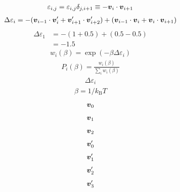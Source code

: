 \documentclass[43pt]{jsarticle}
\def\vector#1{\mbox{\boldmath \(#1\)}}
\begin{document}
\begin{eqnarray*}
  \varepsilon_{i, j} = \varepsilon_{i, j}\delta_{j, i+1} \equiv - \vector{v}_{i} \cdot \vector{v}_{i+1}
\end{eqnarray*}
\newpage
\begin{eqnarray*}
  \Delta \varepsilon_{i} = -(\vector{v}_{i-1} \cdot \vector{v}'_{i} + \vector{v}'_{i+1} \cdot \vector{v}'_{i + 2})
  + (\vector{v}_{i-1} \cdot \vector{v}_{i} + \vector{v}_{i} \cdot \vector{v}_{i+1})
\end{eqnarray*}
\newpage
\begin{align*}
  \Delta \varepsilon_{1} &= -(1 + 0.5) + (0.5 - 0.5) \\
  &= -1.5
\end{align*}
\newpage
\begin{eqnarray*}
  w_{i}(\beta) = \exp \left( - \beta \Delta \varepsilon_{i} \right)
\end{eqnarray*}
\newpage
\begin{eqnarray*}
  P_{i}(\beta) = \frac{w_{i}(\beta)}{\displaystyle \sum_{i} w_{i}(\beta)}
\end{eqnarray*}
\newpage
\begin{eqnarray*}
  \Delta \varepsilon_{i}
\end{eqnarray*}
\newpage
\begin{eqnarray*}
  \beta = 1 / k_{\mathrm{B}} T
\end{eqnarray*}
\newpage
\begin{eqnarray*}
  \vector{v}_{0}
\end{eqnarray*}
\newpage
\begin{eqnarray*}
  \vector{v}_{1}
\end{eqnarray*}
\newpage
\begin{eqnarray*}
  \vector{v}_{2}
\end{eqnarray*}
\newpage
\begin{eqnarray*}
  \vector{v}'_{0}
\end{eqnarray*}
\newpage
\begin{eqnarray*}
  \vector{v}'_{1}
\end{eqnarray*}
\newpage
\begin{eqnarray*}
  \vector{v}'_{2}
\end{eqnarray*}
\newpage
\begin{eqnarray*}
  \vector{v}'_{3}
\end{eqnarray*}
\newpage
\end{document}
